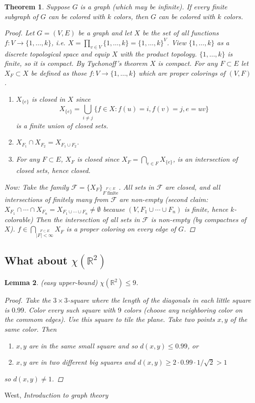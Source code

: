 \documentclass[a4paper]{article}
\theoremstyle{plain}
\newtheorem{lemma}{Lemma}
\newtheorem{theorem}[lemma]{Theorem}
\theoremstyle{myremark}
\newcommand{\codts}{\cdots}
\begin{document}
\begin{theorem}
Suppose $G$ is a graph (which may be infinite).  If every \emph{finite}
subgraph of $G$ can be colored with $k$ colors, then $G$ can be colored with $k$ colors.
\begin{proof}
Let $G = (V,E)$ be a graph and let $X$ be the set of all functions $f
\colon V \rightarrow \{1,\ldots,k\}$, i.e. $X = \prod_{v \in
V}\{1,\ldots,k\} = \{1,\ldots,k\}^V$. View $\{1,\ldots,k\}$ as a
discrete topological space and equip $X$ with the product topology.
$\{1,\ldots,k\}$ is finite, so it is compact. By Tychonoff's theorem $X$
is compact. For any $F \subset E$ let $X_F \subset X$ be defined as
those $f \colon V \rightarrow \{1,\ldots,k\}$ which are proper colorings
of $(V,F)$.
\begin{enumerate}
\item $X_{\{e\}}$ is closed in $X$ since
\[
X_{\{e\}} = \bigcup_{i\neq j}\{f \in X : f(u) = i, f(v) = j, e = uv \}
\]
is a finite union of closed sets.
\item $X_{F_1} \cap X_{F_2} = X_{F_1 \cup F_2}$.
\item For any $F \subset E$, $X_F$ is closed since $X_F = \bigcap_{e \in
F}X_{\{e\}}$, is an intersection of closed sets, hence closed.
\end{enumerate}
Now: Take the family $\mathcal{F} = \{X_F\}_{\stackrel{F \subset E}{F
\text{ finite}}}$. All sets in $\mathcal{F}$ are closed, and all
intersections of finitely many from $\mathcal{F}$ are non-empty (second
claim: $X_{F_1} \cap \codts \cap X_{F_n} = X_{F_1 \cup \codts \cup F_n}
\neq \emptyset$ because $(V, F_1 \cup \cdots \cup F_n)$ is finite, hence
$k$-colorable) Then the intersection of all sets in $\mathcal{F}$ is
non-empty (by compactnes of $X$). $f \in \bigcap_{\stackrel{ F \subset
E}{|F| < \infty }}X_F$ is a proper coloring on \emph{every} edge of $G$.
\end{proof}
\end{theorem}

\subsection*{What about $\chi(\mathbb{R}^2)$}
\begin{lemma}
(easy upper-bound) $\chi(\mathbb{R}^2) \le 9$.
\begin{proof}
Take the $3 \times 3$-square where the length of the diagonals in each
little square is $0.99$. Color every such square with $9$ colors (choose
any neighboring color on the commom edges). Use this square to tile the
plane. Take two points $x,y$ of the same color. Then
\begin{enumerate}
\item $x,y$ are in the same small square and so $d(x,y) \le 0.99$, or
\item $x,y$ are in two different big squares and $d(x,y) \ge 2 \cdot
0.99 \cdot 1/\sqrt{2} > 1$
\end{enumerate}
so $d(x,y) \neq 1$.
\end{proof}
\end{lemma}


\begin{thebibliography}{9}
 West, \textit{Introduction to graph theory}

\end{thebibliography}
\end{document}
